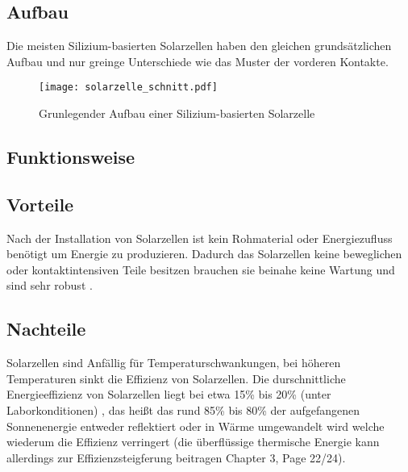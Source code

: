 \subsection{Aufbau}
    Die meisten Silizium-basierten Solarzellen haben den gleichen
    grundsätzlichen Aufbau und nur greinge Unterschiede wie das Muster
    der vorderen Kontakte.
    \begin{figure}[H]
        \centering
        \texttt{[image: solarzelle\_schnitt.pdf]}
        \caption{Grunlegender Aufbau einer Silizium-basierten Solarzelle}
    \end{figure}
\subsection{Funktionsweise}
\subsection{Vorteile}
    Nach der Installation von Solarzellen ist kein Rohmaterial oder
    Energiezufluss benötigt um Energie zu produzieren. Dadurch das Solarzellen
    keine beweglichen oder kontaktintensiven Teile besitzen brauchen sie beinahe
    keine Wartung und sind sehr robust \cite{SolarMaintenance}.
\subsection{Nachteile}
    Solarzellen sind Anfällig für Temperaturschwankungen, bei höheren
    Temperaturen sinkt die Effizienz von Solarzellen. Die durschnittliche
    Energieeffizienz von Solarzellen liegt bei etwa 15\% bis 20\% (unter
    Laborkonditionen) \cite{SolarEfficiency}, das heißt das rund 85\% bis 80\%
    der aufgefangenen Sonnenenergie entweder reflektiert oder in Wärme
    umgewandelt wird welche wiederum die Effizienz verringert (die überflüssige
    thermische Energie kann allerdings zur Effizienzsteigferung beitragen
    \cite{PhotovoltaicPrinciples} Chapter 3, Page 22/24).
